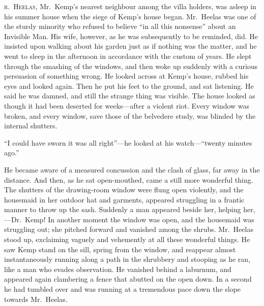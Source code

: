 \label{ch:28}
\begin{ChapterStart}
\vspace*{2\nbs}

\vspace{1.5\nbs}
\end{ChapterStart}

\kern-6pt\textsc{r.\ Heelas}, Mr.\ Kemp’s nearest neighbour among the villa holders, was asleep in his summer house when the siege of Kemp’s house began. Mr.\ Heelas was one of the sturdy minority who refused to believe “in all this nonsense” about an Invisible Man. His wife, however, as he was subsequently to be reminded, did. He insisted upon walking about his garden just as if nothing was the matter, and he went to sleep in the afternoon in accordance with the custom of years. He slept through the smashing of the windows, and then woke up suddenly with a curious persuasion of something wrong. He looked across at Kemp’s house, rubbed his eyes and looked again. Then he put his feet to the ground, and sat listening. He said he was damned, and still the strange thing was visible. The house looked as though it had been deserted for weeks—after a violent riot. Every window was broken, and every window, save those of the belvedere study, was blinded by the internal shutters.

“I could have sworn it was all right”—he looked at his watch—“twenty minutes ago.”

He became aware of a measured concussion and the clash of glass, far away in the distance. And then, as he sat open-mouthed, came a still more wonderful thing. The shutters of the drawing-room window were flung open violently, and the housemaid in her outdoor hat and garments, appeared struggling in a frantic manner to throw up the sash. Suddenly a man appeared beside her, helping her,—Dr.\ Kemp! In another moment the window was open, and the housemaid was struggling out; she pitched forward and vanished among the shrubs. Mr.\ Heelas stood up, exclaiming vaguely and vehemently at all these wonderful things. He saw Kemp stand on the sill, spring from the window, and reappear almost instantaneously running along a path in the shrubbery and stooping as he ran, like a man who evades observation. He vanished behind a laburnum, and appeared again clambering a fence that abutted on the open down. In a second he had tumbled over and was running at a tremendous pace down the slope towards Mr.\ Heelas.

